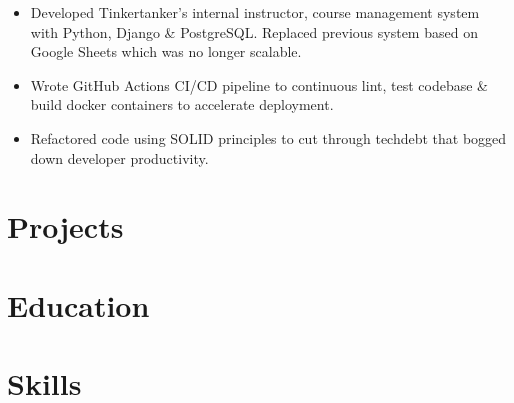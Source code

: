 \begin{itemize}
  \item Developed Tinkertanker's internal instructor, course
    management system with Python, Django \& PostgreSQL. Replaced previous
    system based on Google Sheets which was no longer scalable.
  \item Wrote GitHub Actions CI/CD pipeline to continuous lint, test codebase
    \& build docker containers to accelerate deployment.
  \item Refactored code using SOLID principles to cut through techdebt that
    bogged down developer productivity.
\end{itemize}

\section{Projects}
  
\section{Education}

\section{Skills}
